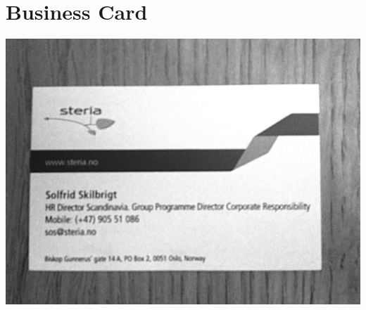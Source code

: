 \documentclass[letterpaper, 12pt]{report}
\begin{document}



\chapter{Business Card}
\includegraphics[width=\textwidth]{visittkort}


\printbibliography
{}
{}
\end{document}
